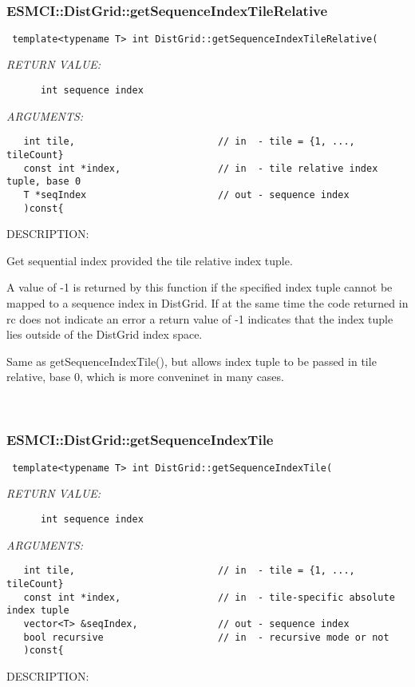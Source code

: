  
\mbox{}\hrulefill\
 
\subsubsection [ESMCI::DistGrid::getSequenceIndexTileRelative] {ESMCI::DistGrid::getSequenceIndexTileRelative}


  
\begin{verbatim} template<typename T> int DistGrid::getSequenceIndexTileRelative(\end{verbatim}{\em RETURN VALUE:}
\begin{verbatim}      int sequence index\end{verbatim}{\em ARGUMENTS:}
\begin{verbatim}   int tile,                         // in  - tile = {1, ..., tileCount}
   const int *index,                 // in  - tile relative index tuple, base 0
   T *seqIndex                       // out - sequence index
   )const{\end{verbatim}
{\sf DESCRIPTION:\\ }


      Get sequential index provided the tile relative index tuple.
  
      A value of -1 is returned by this function if the specified index tuple
      cannot be mapped to a sequence index in DistGrid. If at the same time
      the code returned in rc does not indicate an error a return value of -1
      indicates that the index tuple lies outside of the DistGrid index space.
  
      Same as getSequenceIndexTile(), but allows index tuple to be passed in
      tile relative, base 0, which is more conveninet in many cases.
   
 
\mbox{}\hrulefill\
 
\subsubsection [ESMCI::DistGrid::getSequenceIndexTile] {ESMCI::DistGrid::getSequenceIndexTile}


  
\begin{verbatim} template<typename T> int DistGrid::getSequenceIndexTile(\end{verbatim}{\em RETURN VALUE:}
\begin{verbatim}      int sequence index\end{verbatim}{\em ARGUMENTS:}
\begin{verbatim}   int tile,                         // in  - tile = {1, ..., tileCount}
   const int *index,                 // in  - tile-specific absolute index tuple
   vector<T> &seqIndex,              // out - sequence index
   bool recursive                    // in  - recursive mode or not
   )const{\end{verbatim}
{\sf DESCRIPTION:\\ }


